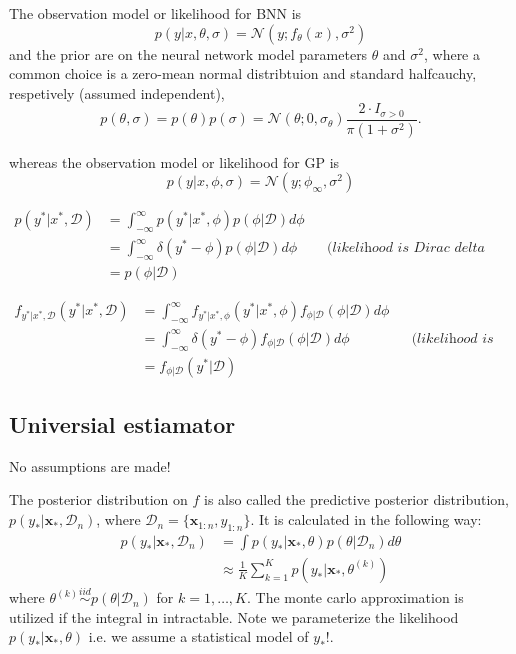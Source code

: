 The observation model or likelihood for BNN is 
$$p(y|x,\theta,\sigma) = \mathcal{N}(y; f_{\theta}(x),\sigma^2)$$
and the prior are on the neural network model parameters $\theta$ and $\sigma^2$, where a
common choice is a zero-mean normal distribtuion and standard halfcauchy, respetively (assumed independent), 
$$p(\theta,\sigma) = p(\theta)p(\sigma) = \mathcal{N}(\theta;0,\sigma_{\theta}) \frac{2\cdot I_{\sigma>0}}{\pi(1+\sigma^2)}.$$


whereas the observation model or likelihood for GP is
$$p(y|x,\phi,\sigma) = \mathcal{N}(y;\phi_{\infty},\sigma^2)$$ 


\begin{align*}
    p(y^*|x^*, \mathcal{D}) &= \int_{-\infty}^{\infty} p(y^*|x^*, \phi) p(\phi| \mathcal{D}) d\phi\\
    &= \int_{-\infty}^{\infty} \delta(y^*-\phi) p(\phi| \mathcal{D}) d\phi&&\textit{(likelihood is Dirac delta distributed)}\\
    &= p(\phi| \mathcal{D}) 
\end{align*}

\begin{align*}
    f_{y^*|x^*, \mathcal{D}}(y^*|x^*, \mathcal{D}) &= \int_{-\infty}^{\infty} f_{y^*|x^*, \phi}(y^*|x^*, \phi) f_{\phi| \mathcal{D}}(\phi| \mathcal{D}) d\phi\\
    &= \int_{-\infty}^{\infty} \delta(y^*-\phi) f_{\phi| \mathcal{D}}(\phi| \mathcal{D}) d\phi&&\textit{(likelihood is Dirac delta distributed)}\\
    &= f_{\phi| \mathcal{D}}(y^*| \mathcal{D}) 
\end{align*}


\subsection{Universial estiamator}
No assumptions are made! 


The posterior distribution on $f$ is also called the predictive posterior distribution, $p(y_*|\textbf{x}_*,\mathcal{D}_n)$, where $\mathcal{D}_n = \{\textbf{x}_{1:n},y_{1:n}\}$. It is calculated in the following way:
\begin{align*}
    p(y_*|\textbf{x}_*,\mathcal{D}_n) &= \int p(y_*| \textbf{x}_*,\theta)p(\theta|\mathcal{D}_n)d\theta\\
    &\approx  \frac{1}{K} \sum_{k=1}^K p(y_*|\textbf{x}_*,\theta^{(k)})
\end{align*}
where $\theta^{(k)} \stackrel{iid}{\sim} p(\theta|\mathcal{D}_n)$ for $k = 1,\dots, K$. The monte carlo approximation is utilized if the integral in intractable. Note we parameterize the likelihood $p(y_*| \textbf{x}_*,\theta)$ i.e. we assume a statistical model of $y_*$!.  
